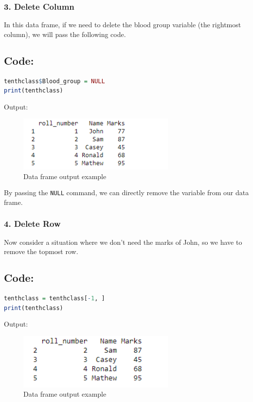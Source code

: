 \documentclass[10pt]{book}
\begin{document}
\subsubsection*{3. Delete Column}
In this data frame, if we need to delete the blood group variable (the rightmost column), we will pass the following code.

\subsection*{Code:}
\begin{lstlisting}[language=R]
tenthclass$Blood_group = NULL
print(tenthclass)
\end{lstlisting}

\noindent Output:
\begin{figure}[H]
    \begin{flushleft}
        \includegraphics[width=0.7\textwidth]{Data-Frames-in-R-1-12.png}
        \caption{Data frame output example}
        \label{fig:dataframe}
    \end{flushleft}
\end{figure}

By passing the \texttt{NULL} command, we can directly remove the variable from our data frame.

\subsubsection*{4. Delete Row}
Now consider a situation where we don’t need the marks of John, so we have to remove the topmost row.

\subsection*{Code:}
\begin{lstlisting}[language=R]
tenthclass = tenthclass[-1, ]
print(tenthclass)
\end{lstlisting}

\noindent Output:
\begin{figure}[H]
    \begin{flushleft}
        \includegraphics[width=0.7\textwidth]{Data-Frames-in-R-1-14.png}
        \caption{Data frame output example}
        \label{fig:dataframe}
    \end{flushleft}
\end{figure}
\end{document}

